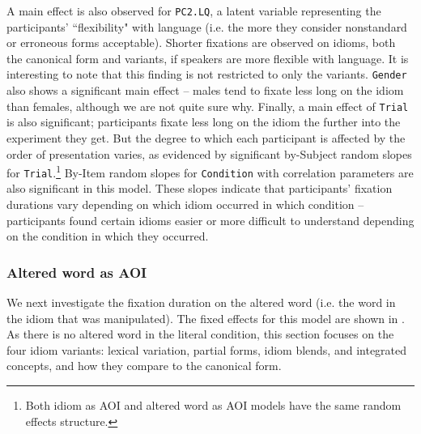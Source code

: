 \documentclass[output=paper
,modfonts
,nonflat]{langsci/langscibook}
\begin{document}
A main effect is also observed for \texttt{PC2.LQ}, a latent variable representing the participants' ``flexibility" with language (i.e. the more they consider nonstandard or erroneous forms acceptable). Shorter fixations are observed on idioms, both the canonical form and variants, if speakers are more flexible with language. It is interesting to note that this finding is not  restricted to only the variants. \texttt{Gender} also shows a significant main effect -- males tend to fixate less long on the idiom than females, although we are not quite sure why. Finally, a main effect of \texttt{Trial} is also significant; participants fixate less long on the idiom the further into the experiment they get. But the degree to which each participant is affected by the order of presentation varies, as evidenced by significant by-Subject random slopes for \texttt{Trial}.\footnote{Both idiom as AOI and altered word as AOI models have the same random effects structure.} By-Item random slopes for \texttt{Condition} with correlation parameters are also significant in this model. These slopes indicate that participants' fixation durations vary depending on which idiom occurred in which condition -- participants found certain idioms easier or more difficult to understand depending on the condition in which they occurred. 



\subsubsection{Altered word as AOI}

We next investigate the fixation duration on the altered word (i.e. the word in the idiom that was manipulated). The fixed effects for this model are shown in . As there is no altered word in the literal condition, this section focuses on the four idiom variants: lexical variation, partial forms, idiom blends, and integrated concepts, and how they compare to the canonical form. 
\end{document}
